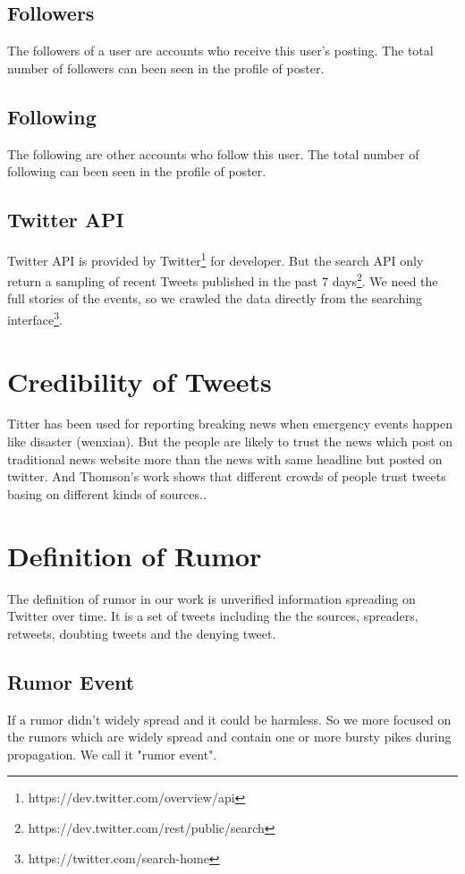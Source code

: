 \subsection{Followers}
The followers of a user are accounts who receive this user's posting. The total number of followers can been seen in the profile of poster.
\subsection{Following}
The following are other accounts who follow this user. The total number of following can been seen in the profile of poster.
\subsection{Twitter API}
Twitter API is provided by Twitter\footnote{https://dev.twitter.com/overview/api} for developer. But the search API only return a sampling of recent Tweets published in the past 7 days\footnote{https://dev.twitter.com/rest/public/search}. We need the full stories of the events, so we crawled the data directly from the searching interface\footnote{https://twitter.com/search-home}.
\section{Credibility of Tweets } %
Titter has been used for reporting breaking news when emergency events happen like disaster (wenxian). But the people are likely to trust the news which post on traditional news website more than the news with same headline but posted on twitter. And Thomson's work shows that different crowds of people trust tweets basing on different kinds of sources.\cite{thomson2012trusting}.

 \section{Definition of Rumor}
 The definition of rumor in our work is unverified information spreading on Twitter over time. It is a set of tweets including the the sources, spreaders, retweets, doubting  tweets and the denying tweet. 
 \subsection{Rumor Event}
 If a rumor didn't widely spread and it could be harmless. So we more focused on the rumors which are widely spread and contain one or more bursty pikes during propagation. We call it "rumor event".
